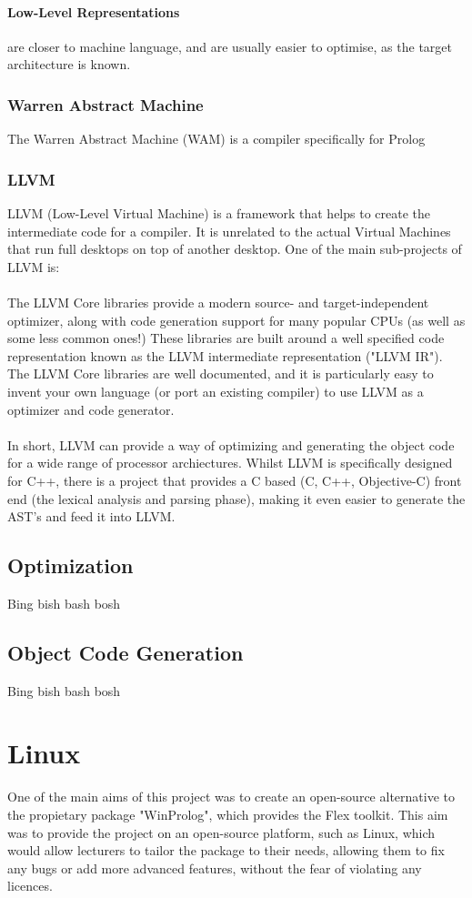 \documentclass[12pt]{report}
\begin{document}
\paragraph{Low-Level Representations} are closer to machine language, and are usually easier to optimise, as the target architecture is known.
\subsubsection{Warren Abstract Machine}\label{subsubsec:wam}
The Warren Abstract Machine (WAM) is a compiler specifically for Prolog
\subsubsection{LLVM}\label{subsubsec:llvm}
LLVM (Low-Level Virtual Machine) is a framework that helps to create the intermediate code for a compiler.  It is unrelated to the actual Virtual Machines that run full desktops on top of another desktop.  One of the main sub-projects of LLVM is:\\
\\
The LLVM Core libraries provide a modern source- and target-independent optimizer, along with code generation support for many popular CPUs (as well as some less common ones!) These libraries are built around a well specified code representation known as the LLVM intermediate representation ("LLVM IR"). The LLVM Core libraries are well documented, and it is particularly easy to invent your own language (or port an existing compiler) to use LLVM as a optimizer and code generator. \citep{llvm10}
\\
\\
In short, LLVM can provide a way of optimizing and generating the object code for a wide range of processor archiectures.  Whilst LLVM is specifically designed for C++, there is a project that provides a C based (C, C++, Objective-C) front end (the lexical analysis and parsing phase), making it even easier to generate the AST's and feed it into LLVM.
\subsection{Optimization}\label{subsec:optimization}
Bing bish bash bosh
\subsection{Object Code Generation}\label{subsec:object_code_gen}
Bing bish bash bosh


\section{Linux}\label{sec:linux}
One of the main aims of this project was to create an open-source alternative to the propietary package "WinProlog", which provides the Flex toolkit.  This aim was to provide the project on an open-source platform, such as Linux, which would allow lecturers to tailor the package to their needs, allowing them to fix any bugs or add more advanced features, without the fear of violating any licences.\\
\\
\\
\end{document}
